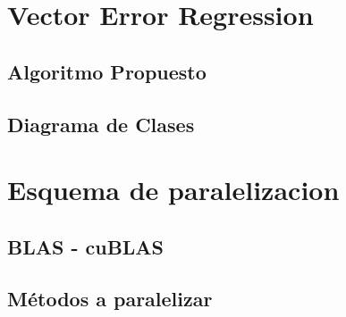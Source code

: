 \section{Vector Error Regression}
\subsection{Algoritmo Propuesto}
\subsection{Diagrama de Clases}

\section{Esquema de paralelizacion}
\subsection{BLAS - cuBLAS}
\subsection{Métodos a paralelizar}
